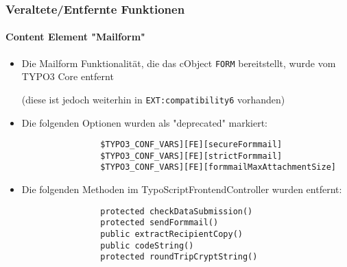 
\begin{frame}[fragile]
	\frametitle{Veraltete/Entfernte Funktionen}
	\framesubtitle{Content Element "Mailform"}

	\begin{itemize}

		\item Die Mailform Funktionalität, die das cObject \texttt{FORM} bereitstellt,
			wurde vom TYPO3 Core entfernt

			\small
				(diese ist jedoch weiterhin in \texttt{EXT:compatibility6} vorhanden)
			\normalsize

		\item Die folgenden Optionen wurden als "deprecated" markiert:

			\begin{lstlisting}
				$TYPO3_CONF_VARS][FE][secureFormmail]
				$TYPO3_CONF_VARS][FE][strictFormmail]
				$TYPO3_CONF_VARS][FE][formmailMaxAttachmentSize]
			\end{lstlisting}

		\item Die folgenden Methoden im TypoScriptFrontendController wurden entfernt:

			\begin{lstlisting}
				protected checkDataSubmission()
				protected sendFormmail()
				public extractRecipientCopy()
				public codeString()
				protected roundTripCryptString()
			\end{lstlisting}

	\end{itemize}

\end{frame}



